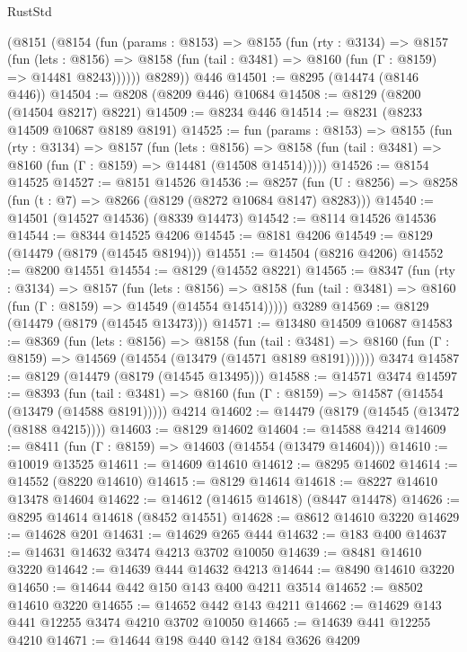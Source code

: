 \begin{lexlean}{RustStd}
\begin{coremodule}
      (@8151
        (@8154
          (fun (params : @8153) =>
          @8155
            (fun (rty : @3134) =>
            @8157
              (fun (lets : @8156) =>
              @8158 (fun (tail : @3481) => @8160 (fun (Γ : @8159) => @14481 @8243))))))
        @8289))
    @446
@14501 := @8295 (@14474 (@8146 @446))
@14504 := @8208 (@8209 @446) @10684
@14508 := @8129 (@8200 (@14504 @8217) @8221)
@14509 := @8234 @446
@14514 := @8231 (@8233 @14509 @10687 @8189 @8191)
@14525 := fun (params : @8153) =>
  @8155
    (fun (rty : @3134) =>
    @8157
      (fun (lets : @8156) =>
      @8158 (fun (tail : @3481) => @8160 (fun (Γ : @8159) => @14481 (@14508 @14514)))))
@14526 := @8154 @14525
@14527 := @8151 @14526
@14536 := @8257
    (fun (U : @8256) => @8258 (fun (t : @7) => @8266 (@8129 (@8272 @10684 @8147) @8283)))
@14540 := @14501 (@14527 @14536) (@8339 @14473)
@14542 := @8114 @14526 @14536
@14544 := @8344 @14525 @4206
@14545 := @8181 @4206
@14549 := @8129 (@14479 (@8179 (@14545 @8194)))
@14551 := @14504 (@8216 @4206)
@14552 := @8200 @14551
@14554 := @8129 (@14552 @8221)
@14565 := @8347
    (fun (rty : @3134) =>
    @8157
      (fun (lets : @8156) =>
      @8158 (fun (tail : @3481) => @8160 (fun (Γ : @8159) => @14549 (@14554 @14514)))))
    @3289
@14569 := @8129 (@14479 (@8179 (@14545 @13473)))
@14571 := @13480 @14509 @10687
@14583 := @8369
    (fun (lets : @8156) =>
    @8158
      (fun (tail : @3481) =>
      @8160 (fun (Γ : @8159) => @14569 (@14554 (@13479 (@14571 @8189 @8191))))))
    @3474
@14587 := @8129 (@14479 (@8179 (@14545 @13495)))
@14588 := @14571 @3474
@14597 := @8393
    (fun (tail : @3481) => @8160 (fun (Γ : @8159) => @14587 (@14554 (@13479 (@14588 @8191)))))
    @4214
@14602 := @14479 (@8179 (@14545 (@13472 (@8188 @4215))))
@14603 := @8129 @14602
@14604 := @14588 @4214
@14609 := @8411 (fun (Γ : @8159) => @14603 (@14554 (@13479 @14604)))
@14610 := @10019 @13525
@14611 := @14609 @14610
@14612 := @8295 @14602
@14614 := @14552 (@8220 @14610)
@14615 := @8129 @14614
@14618 := @8227 @14610 @13478 @14604
@14622 := @14612 (@14615 @14618) (@8447 @14478)
@14626 := @8295 @14614 @14618 (@8452 @14551)
@14628 := @8612 @14610 @3220
@14629 := @14628 @201
@14631 := @14629 @265 @444
@14632 := @183 @400
@14637 := @14631 @14632 @3474 @4213 @3702 @10050
@14639 := @8481 @14610 @3220
@14642 := @14639 @444 @14632 @4213
@14644 := @8490 @14610 @3220
@14650 := @14644 @442 @150 @143 @400 @4211 @3514
@14652 := @8502 @14610 @3220
@14655 := @14652 @442 @143 @4211
@14662 := @14629 @143 @441 @12255 @3474 @4210 @3702 @10050
@14665 := @14639 @441 @12255 @4210
@14671 := @14644 @198 @440 @142 @184 @3626 @4209

\end{coremodule}
\end{lexlean}
